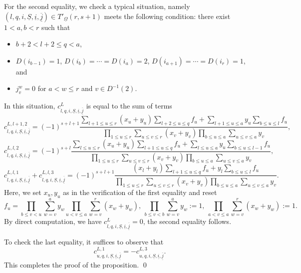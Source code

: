 \documentclass[12pt, a4paper]{article}
\begin{document}
For the second equality, we check a typical situation, namely $(l, q, i, \underline{S}, \underline{i}, \underline{\overline{j}}) \in T'_{\underline{\Omega}}(r, s+1)$ meets the following condition: there exist $1<a,b<r$ such that
\begin{itemize}
    \item $b+2<l+2\leq q<a$, 
    \item $D(i_{b-1})=1$, $D(i_b)=\cdots=D(i_a)=2$, $D(i_{a+1})=\cdots=D(i_r)=1$, and
    \item $j^w_v=0$ for $a<w\leq r$ and $v\in D^{-1}(2)$.
\end{itemize}
In this situation, $c^L_{l, q, i, \underline{S}, \underline{i}, \underline{\overline{j}}}$ is equal to the sum of terms
$$
c^{L,l+1,2}_{l, q, i, \underline{S}, \underline{i}, \underline{\overline{j}}}=(-1)^{s+l+1}\frac{\sum_{l+1\leq u\leq r}(x_u+y_u)\sum_{l+2\leq u\leq q}f_u+\sum_{l+1\leq u\leq a}y_u\sum_{b\leq u\leq l}f_u}{\prod_{1\leq u\leq r}\sum_{u\leq v\leq r}(x_v+y_v)\prod_{b\leq u\leq a}\sum_{u\leq v\leq a}y_v},$$
$$
c^{L,l,2}_{l, q, i, \underline{S}, \underline{i}, \underline{\overline{j}}}=(-1)^{s+l}\frac{\sum_{l\leq u\leq r}(x_u+y_u)\sum_{l+1\leq u\leq q}f_u+\sum_{l\leq u\leq a}y_u\sum_{b\leq u\leq l-1}f_u}{\prod_{1\leq u\leq r}\sum_{u\leq v\leq r}(x_v+y_v)\prod_{b\leq u\leq a}\sum_{u\leq v\leq a}y_v},$$
$$
c^{L,l,1}_{l, q, i, \underline{S}, \underline{i}, \underline{\overline{j}}}+c^{L,l,3}_{l, q, i, \underline{S}, \underline{i}, \underline{\overline{j}}}=(-1)^{s+l+1}\frac{(x_l+y_l)\sum_{l+1\leq u\leq q}f_u+y_l\sum_{b\leq u\leq l}f_u}{\prod_{1\leq u\leq r}\sum_{u\leq v\leq r}(x_v+y_v)\prod_{b\leq u\leq a}\sum_{u\leq v\leq a}y_v}.$$
Here, we set $x_u,y_u$ as in the verification of the first equality and reset 
$$
f_u=\prod_{b\leq v<u}\sum_{w=v}^ay_w\prod_{u<v\leq a}\sum_{w=v}^r(x_w+y_w),~\prod_{b\leq v<b}\sum_{w=v}^ay_w:=1,~\prod_{a<v\leq a}\sum_{w=v}^r(x_w+y_w):=1.$$
By direct computation, we have $c^L_{l, q, i, \underline{S}, \underline{i}, \underline{\overline{j}}}=0$, the second equality follows.

To check the last equality, it suffices to observe that 
$$
c^{L,1}_{u, q, i, \underline{S}, \underline{i}, \underline{\overline{j}}}=-c^{L,3}_{u, q, i, \underline{S}, \underline{i}, \underline{\overline{j}}}.
$$
This completes the proof of the proposition. \qed
\end{document}
